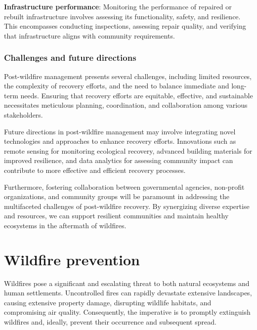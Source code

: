 \documentclass[
  12 pt,
]{Nemilov}
\begin{document}
\textbf{Infrastructure performance}: Monitoring the performance of repaired or rebuilt infrastructure involves assessing its functionality, safety, and resilience. This encompasses conducting inspections, assessing repair quality, and verifying that infrastructure aligns with community requirements.

\subsection{Challenges and future directions}\label{challenges-and-future-directions-2}

Post-wildfire management presents several challenges, including limited resources, the complexity of recovery efforts, and the need to balance immediate and long-term needs. Ensuring that recovery efforts are equitable, effective, and sustainable necessitates meticulous planning, coordination, and collaboration among various stakeholders.

Future directions in post-wildfire management may involve integrating novel technologies and approaches to enhance recovery efforts. Innovations such as remote sensing for monitoring ecological recovery, advanced building materials for improved resilience, and data analytics for assessing community impact can contribute to more effective and efficient recovery processes.

Furthermore, fostering collaboration between governmental agencies, non-profit organizations, and community groups will be paramount in addressing the multifaceted challenges of post-wildfire recovery. By synergizing diverse expertise and resources, we can support resilient communities and maintain healthy ecosystems in the aftermath of wildfires.

\chapter{Wildfire prevention}\label{wildfire-prevention}

Wildfires pose a significant and escalating threat to both natural ecosystems and human settlements. Uncontrolled fires can rapidly devastate extensive landscapes, causing extensive property damage, disrupting wildlife habitats, and compromising air quality. Consequently, the imperative is to promptly extinguish wildfires and, ideally, prevent their occurrence and subsequent spread.
\end{document}
